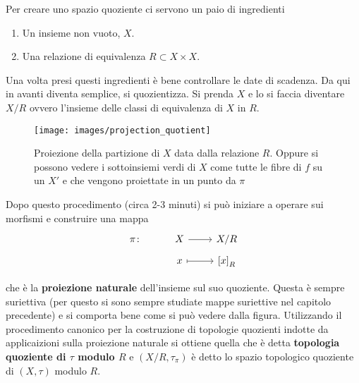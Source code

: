 Per creare uno spazio quoziente ci servono un paio di ingredienti
\begin{enumerate}
	\item Un insieme non vuoto, $X$.
	\item Una relazione di equivalenza $R \subset X \times X$.
\end{enumerate}

Una volta presi questi ingredienti è bene controllare le date di scadenza. Da qui in avanti diventa semplice, si quozientizza. Si prenda $X$ e lo si faccia diventare $X / R$ ovvero l'insieme delle classi di equivalenza di $X$ in $R$. 

\begin{figure}[h]
	\centering
	\texttt{[image: images/projection\_quotient]}
	\caption{Proiezione della partizione di $X$ data dalla relazione $R$. Oppure si possono vedere i sottoinsiemi verdi di $X$ come tutte le fibre di $f$ su un $X'$ e che vengono proiettate in un punto da $\pi$}
	\label{fig:projectionquotient}
\end{figure}

Dopo questo procedimento (circa 2-3 minuti) si può iniziare a operare sui morfismi e construire una mappa 
\begin{equation}
\begin{tikzcd}[row sep = tiny]
	\pi  \colon &  X \arrow{r} & X/R \\
		 & x \arrow[mapsto]{r} & \left[x\right]_R
\end{tikzcd}
\end{equation}


che è la \textbf{proiezione naturale} dell'insieme sul suo quoziente. Questa è sempre suriettiva (per questo si sono sempre studiate mappe suriettive nel capitolo precedente) e si comporta bene come si può vedere dalla figura. Utilizzando il procedimento canonico per la costruzione di topologie quozienti indotte da applicaizioni sulla proiezione naturale si ottiene quella che è detta \textbf{topologia quoziente di $\tau$ modulo $R$} e $(X/R, \tau_\pi)$ è detto lo spazio topologico quoziente di $(X,\tau)$ modulo $R$.


